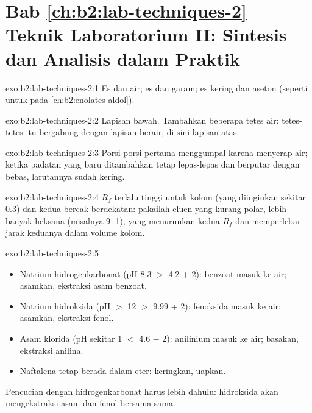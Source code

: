 \section*{Bab \ref{ch:b2:lab-techniques-2} --- Teknik Laboratorium II: Sintesis dan Analisis dalam Praktik}

\begin{solution}{exo:b2:lab-techniques-2:1}
Es dan air; es dan garam; es kering dan aseton (seperti untuk  pada \cref{ch:b2:enolates-aldol}).
\end{solution}

\begin{solution}{exo:b2:lab-techniques-2:2}
Lapisan bawah. Tambahkan beberapa tetes air: tetes-tetes itu bergabung dengan lapisan berair, di sini lapisan atas.
\end{solution}

\begin{solution}{exo:b2:lab-techniques-2:3}
Porsi-porsi pertama menggumpal karena menyerap air; ketika padatan yang baru
ditambahkan tetap lepas-lepas dan berputar dengan bebas, larutannya sudah
kering.
\end{solution}

\begin{solution}{exo:b2:lab-techniques-2:4}
$R_f$ terlalu tinggi untuk kolom (yang diinginkan sekitar 0.3) dan kedua
bercak berdekatan: pakailah eluen yang kurang polar, lebih banyak heksana
(misalnya 9\,:\,1), yang menurunkan kedua $R_f$ dan memperlebar jarak
keduanya dalam volume kolom.
\end{solution}

\begin{solution}{exo:b2:lab-techniques-2:5}
\begin{itemize}
  \item Natrium hidrogenkarbonat (pH 8.3 $>$ 4.2 + 2): benzoat masuk ke air;
        asamkan, ekstraksi asam benzoat.
  \item Natrium hidroksida (pH $>$ 12 $>$ 9.99 + 2): fenoksida masuk ke air;
        asamkan, ekstraksi fenol.
  \item Asam klorida (pH sekitar 1 $<$ 4.6 $-$ 2): anilinium masuk ke air;
        basakan, ekstraksi anilina.
  \item Naftalena tetap berada dalam eter: keringkan, uapkan.
\end{itemize}
Pencucian dengan hidrogenkarbonat harus lebih dahulu: hidroksida akan mengekstraksi asam dan fenol bersama-sama.
\end{solution}

